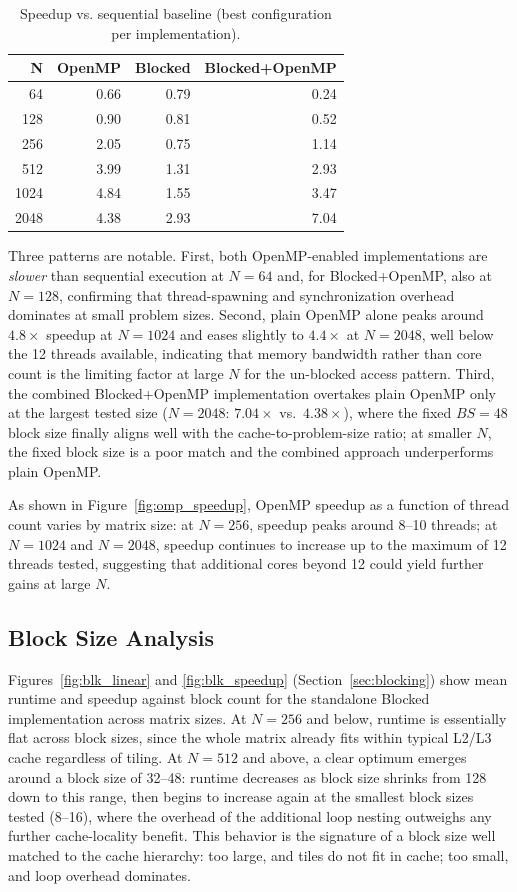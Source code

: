 \documentclass[11pt]{article}
\begin{document}
\begin{table}[h]
\centering
\caption{Speedup vs. sequential baseline (best configuration per implementation).}
\label{tab:speedup}
\begin{tabular}{rrrr}
\toprule
\textbf{N} & \textbf{OpenMP} & \textbf{Blocked} & \textbf{Blocked+OpenMP} \\
\midrule
64   & 0.66 & 0.79 & 0.24 \\
128  & 0.90 & 0.81 & 0.52 \\
256  & 2.05 & 0.75 & 1.14 \\
512  & 3.99 & 1.31 & 2.93 \\
1024 & 4.84 & 1.55 & 3.47 \\
2048 & 4.38 & 2.93 & 7.04 \\
\bottomrule
\end{tabular}
\end{table}

Three patterns are notable. First, both OpenMP-enabled implementations are \emph{slower} than sequential execution at $N=64$ and, for Blocked+OpenMP, also at $N=128$, confirming that thread-spawning and synchronization overhead dominates at small problem sizes. Second, plain OpenMP alone peaks around $4.8\times$ speedup at $N=1024$ and eases slightly to $4.4\times$ at $N=2048$, well below the 12 threads available, indicating that memory bandwidth rather than core count is the limiting factor at large $N$ for the un-blocked access pattern. Third, the combined Blocked+OpenMP implementation overtakes plain OpenMP only at the largest tested size ($N=2048$: $7.04\times$ vs.\ $4.38\times$), where the fixed $BS=48$ block size finally aligns well with the cache-to-problem-size ratio; at smaller $N$, the fixed block size is a poor match and the combined approach underperforms plain OpenMP.

As shown in Figure~\ref{fig:omp_speedup}, OpenMP speedup as a function of thread count varies by matrix size: at $N=256$, speedup peaks around 8--10 threads; at $N=1024$ and $N=2048$, speedup continues to increase up to the maximum of 12 threads tested, suggesting that additional cores beyond 12 could yield further gains at large $N$.

\subsection{Block Size Analysis}
\label{sec:blocksize}

Figures~\ref{fig:blk_linear} and \ref{fig:blk_speedup} (Section~\ref{sec:blocking}) show mean runtime and speedup against block count for the standalone Blocked implementation across matrix sizes. At $N=256$ and below, runtime is essentially flat across block sizes, since the whole matrix already fits within typical L2/L3 cache regardless of tiling. At $N=512$ and above, a clear optimum emerges around a block size of 32--48: runtime decreases as block size shrinks from 128 down to this range, then begins to increase again at the smallest block sizes tested (8--16), where the overhead of the additional loop nesting outweighs any further cache-locality benefit. This behavior is the signature of a block size well matched to the cache hierarchy: too large, and tiles do not fit in cache; too small, and loop overhead dominates.
\end{document}
